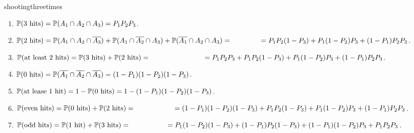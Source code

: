 \begin{sol}{shootingthreetimes}
    \begin{enumerate}
        \item[(a)] $\mathbb{P}(\text{3 hits}) = \mathbb{P}(A_1\cap A_2\cap A_3) = P_1P_2P_3$.
        \item[(b)] $\PP(\text{2 hits}) = \PP(A_1\cap A_2\cap\overline{A_3}) + \PP(A_1\cap\overline{A_2}\cap A_3) + \PP(\overline{A_1}\cap A_2\cap A_3) = \\
        \hphantom{\PP(\text{2 hits})} = P_1P_2(1-P_3) + P_1(1-P_2)P_3 + (1-P_1)P_2P_3$.
        \item[(c)] $\PP(\text{at least 2 hits}) = \PP(\text{3 hits}) + \PP(\text{2 hits}) = \\
        \hphantom{\PP(\text{at least 2 hits})} = P_1P_2P_3 + P_1P_2(1-P_3) + P_1(1-P_2)P_3 + (1-P_1)P_2P_3$.
        \item[(d)] $\mathbb{P}(\text{0 hits}) = \mathbb{P}(\overline{A_1}\cap\overline{A_2}\cap\overline{A_3})=(1-P_1)(1-P_2)(1-P_3)$.
        \item[(e)] $\mathbb{P}(\text{at lease 1 hit})=1-\mathbb{P}(\text{0 hits})=1-(1-P_1)(1-P_2)(1-P_3)$.
        \item[(f)] $\PP(\text{even hits})=\PP(\text{0 hits})+\PP(\text{2 hits})=\\
        \hphantom{\PP(\text{even hits})}=(1-P_1)(1-P_2)(1-P_3)+P_1P_2(1-P_3) + P_1(1-P_2)P_3 + (1-P_1)P_2P_3$.
        \item[(g)] $\PP(\text{odd hits})=\PP(\text{1 hit})+\PP(\text{3 hits})=\\
        \hphantom{\PP(\text{odd hits})}=P_1(1-P_2)(1-P_3)+(1-P_1)P_2(1-P_3)+(1-P_1)(1-P_2)P_3+P_1P_2P_3$.
    \end{enumerate}
\end{sol}

